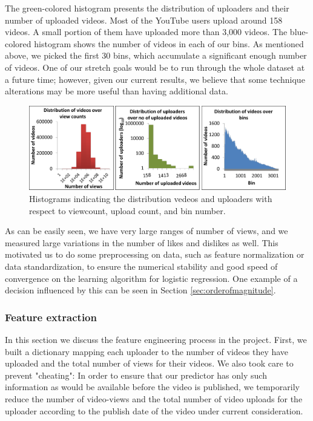 		The green-colored histogram presents the distribution of uploaders and their number of uploaded videos. Most of the YouTube users upload around 158 videos. A small portion of them have uploaded more than 3,000 videos. The blue-colored histogram shows the number of videos in each of our  bins. As mentioned above, we picked the first 30 bins, which accumulate a significant enough number of videos. One of our stretch goals would be to run through the whole dataset at a future time; however, given our current results, we believe that some technique alterations may be more useful than having additional data. 
		
		\begin{figure}[!h]
			\begin{center}
				\includegraphics[width=1.0\textwidth,clip]{distributions.pdf}
			\end{center}
			\caption{Histograms indicating the distribution vedeos and uploaders with respect to viewcount, upload count, and bin number.}
			\label{fig:histograms}
		\end{figure}
	
		As can be easily seen, we have very large ranges of number of views, and we measured large variations in the number of likes and dislikes as well. This motivated us to do some preprocessing on data, such as feature normalization or data standardization, to ensure the numerical stability and good speed of convergence on the learning algorithm for logistic regression. One example of a decision influenced by this can be seen in Section \ref{sec:orderofmagnitude}.
						
	\subsubsection{Feature extraction}
		In this section we discuss the feature engineering process in the project. First, we built a dictionary mapping each uploader to the number of videos they have uploaded and the total number of views for their videos. We also took care to prevent "cheating":  In order to ensure that our predictor has only such information as would be available before the video is published, we temporarily reduce the number of video-views and the total number of video uploads for the uploader according to the publish date of the video under current consideration.

